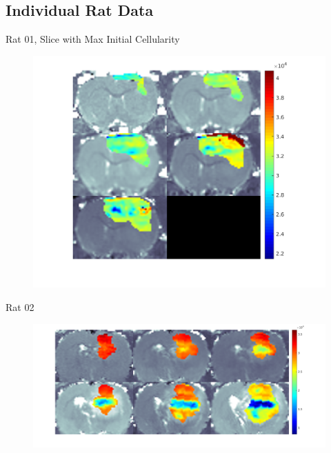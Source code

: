 \documentclass{beamer}
\begin{document}
\subsection{Individual Rat Data}
\begin{frame}{Rat 01, Slice with Max Initial Cellularity}
    \begin{minipage}[t][.7\textheight][t]{\textwidth}
    	\begin{figure}
    	\centering
    	\includegraphics[width=.7\textwidth]{../../mouse-data/Montage01.png}
    	\end{figure}
	\end{minipage}  
\end{frame}

\begin{frame}{Rat 02}
    \begin{minipage}[t][.7\textheight][t]{\textwidth}
    	\begin{figure}
    	\centering
    	\includegraphics[width=.9\textwidth]{../../mouse-data/Montage02.png}
    	\end{figure}
	\end{minipage}  
\end{frame}
\end{document}
